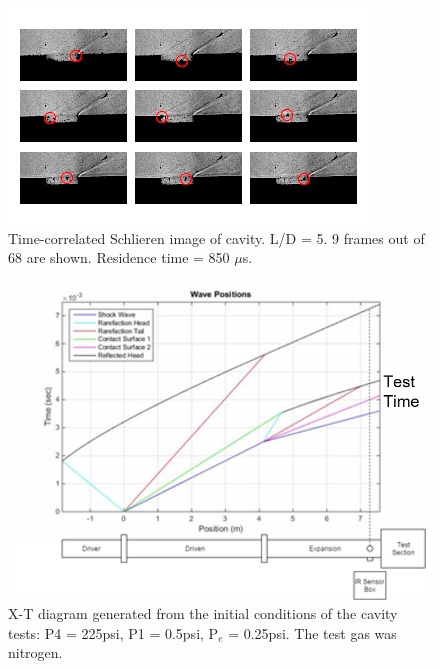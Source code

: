 \begin{figure}
\centering
\includegraphics[width = \textwidth]{Figures/cavResTime.jpg}
\caption[Time-correlated Schlieren image of cavity. L/D = 5.]{Time-correlated Schlieren image of cavity. L/D = 5. 9 frames out of 68 are shown. Residence time = 850 $\mu$s.}
\label{fig:ResTime}
\end{figure}
\clearpage

\begin{figure}
\centering
\includegraphics[width = \textwidth]{Figures/XTDiag.png}
\caption[X-T Diagram of Cavity Tests]{X-T diagram generated from the initial conditions of the cavity tests: P4 = 225psi, P1 = 0.5psi, P$_e$ = 0.25psi. The test gas was nitrogen.}
\label{fig:XT}
\end{figure}

